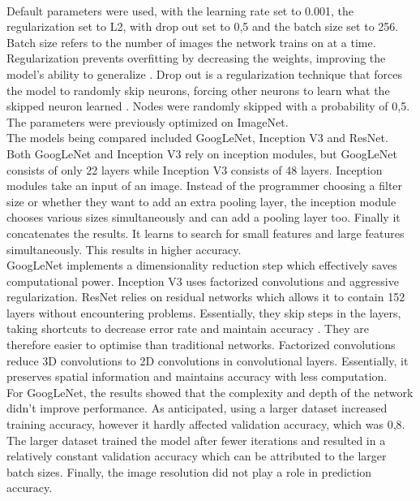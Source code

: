 \\
Default parameters were used, with the learning rate set to 0.001, the regularization set to L2, with drop out set to 0,5 and the batch size set to 256. Batch size refers to the number of images the network trains on at a time. Regularization prevents overfitting by decreasing the weights, improving the model's ability to generalize \cite{19}. Drop out is a regularization technique that forces the model to randomly skip neurons, forcing other neurons to learn what the skipped neuron learned \cite{20}. Nodes were randomly skipped with a probability of 0,5. The parameters were previously optimized on ImageNet.\newline
\\
The models being compared included GoogLeNet, Inception V3 and ResNet. Both GoogLeNet and Inception V3 rely on inception modules, but GoogLeNet consists of only 22 layers while Inception V3 consists of 48 layers. Inception modules take an input of an image. Instead of the programmer choosing a filter size or whether they want to add an extra pooling layer, the inception module chooses various sizes simultaneously and can add a pooling layer too. Finally it concatenates the results. It learns to search for small features and large features simultaneously. This results in higher accuracy. \cite{21} \newline
\\
GoogLeNet implements a dimensionality reduction step which effectively saves computational power. Inception V3 uses factorized convolutions and aggressive regularization. ResNet relies on residual networks which allows it to contain 152 layers without encountering problems. Essentially, they skip steps in the layers, taking shortcuts to decrease error rate and maintain accuracy \cite{20}. They are therefore easier to optimise than traditional networks. Factorized convolutions reduce 3D convolutions to 2D convolutions in convolutional layers. Essentially, it preserves spatial information and maintains accuracy with less computation. \newline
\\
For GoogLeNet, the results showed that the complexity and depth of the network didn’t improve performance. As anticipated, using a larger dataset increased training accuracy, however it hardly affected validation accuracy, which was 0,8. The larger dataset trained the model after fewer iterations and resulted in a relatively constant validation accuracy which can be attributed to the larger batch sizes. Finally, the image resolution did not play a role in prediction accuracy.\newline
